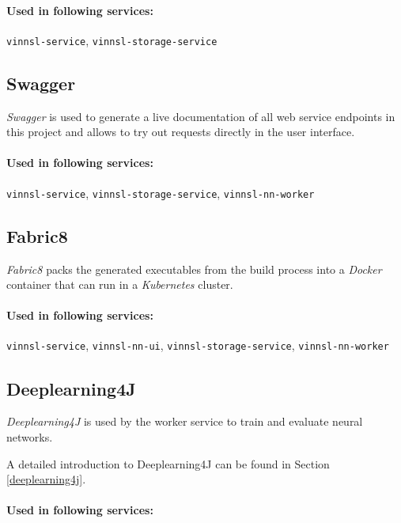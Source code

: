 \paragraph{Used in following
services:}\label{used-in-following-services-2}

\texttt{vinnsl-service}, \texttt{vinnsl-storage-service}

\subsection{Swagger}\label{swagger}

\emph{Swagger} is used to generate a live documentation of all web
service endpoints in this project and allows to try out requests
directly in the user interface.

\paragraph{Used in following
services:}\label{used-in-following-services-3}

\texttt{vinnsl-service}, \texttt{vinnsl-storage-service},
\texttt{vinnsl-nn-worker}

\subsection{Fabric8}\label{fabric8}

\emph{Fabric8} packs the generated executables from the build process
into a \emph{Docker} container that can run in a \emph{Kubernetes}
cluster.

\paragraph{Used in following
services:}\label{used-in-following-services-4}

\texttt{vinnsl-service}, \texttt{vinnsl-nn-ui},
\texttt{vinnsl-storage-service}, \texttt{vinnsl-nn-worker}

\subsection{Deeplearning4J}\label{deeplearning4j-1}

\emph{Deeplearning4J} is used by the worker service to train and
evaluate neural networks.

A detailed introduction to Deeplearning4J can be found in Section
\ref{deeplearning4j}.

\paragraph{Used in following
services:}\label{used-in-following-services-5}

